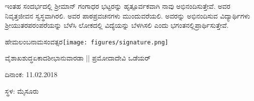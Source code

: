 {ಇಂತಹ ಸಂದರ್ಭದಲ್ಲಿ ಶ್ರೀಮಾನ್ ಗಂಗಾಧರ ಭಟ್ಟರನ್ನು ಹೃತ್ಪೂರ್ವಕವಾಗಿ ನಾವು ಅಭಿನಂದಿಸುತ್ತೇವೆ. ಅವರ ನಿವೃತ್ತಜೀವನ ಸ್ವಸ್ಥವಾಗಿರಲಿ. ಅವರ ಪಾಠಪ್ರವಚನಗಳು ಮುಂದುವರೆಯಲಿ. ಅವರನ್ನು ಅಭಿನಂದಿಸುವ ವಿದ್ಯಾರ್ಥಿಗಳು ಶ್ರೀಯುತರ\break ಪರಂಪರೆಯನ್ನು ಬೆಳೆಸಿ ಲೋಕದಲ್ಲಿ ವಿದ್ಯೆಯನ್ನು ಬೆಳಗಿಸಲಿ ಎಂದು ಭಗಂತನಲ್ಲಿ\break ಪ್ರಾರ್ಥಿಸುತ್ತೇವೆ.

\bigskip

\bigskip

\noindent
ಹೇಮಲಂಬನಾಮಸಂವತ್ಸರ\hfill\texttt{[image: figures/signature.png]}

\noindent
ವೈಶಾಖ\enginline{-}ಶುದ್ಧ\enginline{-}ಏಕಾದಶೀ\enginline{-}ಭಾನುವಾರ\hfill ಡಾ || ಪ್ರಮೋದಾದೇವಿ ಒಡೆಯರ್

\noindent
ದಿನಾಂಕ: 11.02.2018							

\noindent
ಸ್ಥಳ: ಮೈಸೂರು
}
